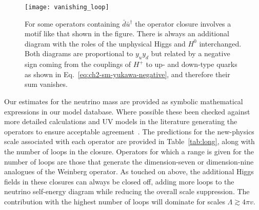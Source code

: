 \begin{figure}[t]
  \centering
  \texttt{[image: vanishing\_loop]}
  \caption[For some operators containing $\bar{d} \bar{u}^{\dagger}$ the
  operator closure involves a motif like that shown in the figure.]{For some
    operators containing $\bar{d} \bar{u}^{\dagger}$ the operator closure
    involves a motif like that shown in the figure. There is always an
    additional diagram with the roles of the unphysical Higgs and $H^{0}$
    interchanged. Both diagrams are proportional to $y_{u} y_{d}$ but related by
    a negative sign coming from the couplings of $H^{+}$ to up- and down-type
    quarks as shown in Eq.~\eqref{eq:ch2-sm-yukawa-negative}, and therefore their
    sum vanishes.}
  \label{fig:ch2-vanishing-loop}
\end{figure}

Our estimates for the neutrino mass are provided as symbolic mathematical
expressions in our model database. Where possible these been checked against
more detailed calculations and UV models in the literature generating the
operators to ensure acceptable agreement~\cite{Duerr:2011zd, Babu:2009aq,
  Babu:2010vp, delAguila:2012nu, Cai:2014kra, Zee:1985id, Babu:1988ki,
  Angel:2013hla, Gargalionis:2019drk}. The predictions for the new-physics scale
associated with each operator are provided in Table~\ref{tab:long}, along with
the number of loops in the closure. Operators for which a range is given for the
number of loops are those that generate the dimension-seven or dimension-nine
analogues of the Weinberg operator. As touched on above, the additional Higgs
fields in these closures can always be closed off, adding more loops to the
neutrino self-energy diagram while reducing the overall scale suppression. The
contribution with the highest number of loops will dominate for scales
$\Lambda \gtrsim 4\pi v$.

